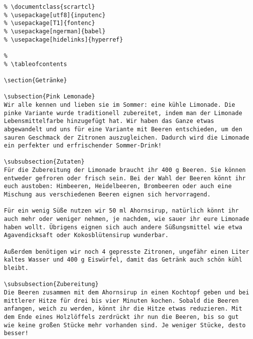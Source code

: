 \begin{verbatim}
% \documentclass{scrartcl}
% \usepackage[utf8]{inputenc}
% \usepackage[T1]{fontenc}
% \usepackage[ngerman]{babel}
% \usepackage[hidelinks]{hyperref}
	
% 
% \tableofcontents
	
\section{Getränke}
	
\subsection{Pink Lemonade}
Wir alle kennen und lieben sie im Sommer: eine kühle Limonade. Die pinke Variante wurde traditionell zubereitet, indem man der Limonade Lebensmittelfarbe hinzugefügt hat. Wir haben das Ganze etwas abgewandelt und uns für eine Variante mit Beeren entschieden, um den sauren Geschmack der Zitronen auszugleichen. Dadurch wird die Limonade ein perfekter und erfrischender Sommer-Drink!
	
\subsubsection{Zutaten}
Für die Zubereitung der Limonade braucht ihr 400 g Beeren. Sie können entweder gefroren oder frisch sein. Bei der Wahl der Beeren könnt ihr euch austoben: Himbeeren, Heidelbeeren, Brombeeren oder auch eine Mischung aus verschiedenen Beeren eignen sich hervorragend. 
	
Für ein wenig Süße nutzen wir 50 ml Ahornsirup, natürlich könnt ihr auch mehr oder weniger nehmen, je nachdem, wie sauer ihr eure Limonade haben wollt. Übrigens eignen sich auch andere Süßungsmittel wie etwa Agavendicksaft oder Kokosblütensirup wunderbar.
	
Außerdem benötigen wir noch 4 gepresste Zitronen, ungefähr einen Liter kaltes Wasser und 400 g Eiswürfel, damit das Getränk auch schön kühl bleibt.
	
\subsubsection{Zubereitung}
Die Beeren zusammen mit dem Ahornsirup in einen Kochtopf geben und bei mittlerer Hitze für drei bis vier Minuten kochen. Sobald die Beeren anfangen, weich zu werden, könnt ihr die Hitze etwas reduzieren. Mit dem Ende eines Holzlöffels zerdrückt ihr nun die Beeren, bis so gut wie keine großen Stücke mehr vorhanden sind. Je weniger Stücke, desto besser!
	

\end{verbatim}
